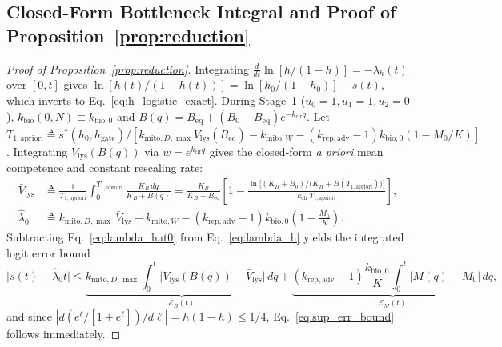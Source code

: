 \documentclass[11pt]{article}
\theoremstyle{plain}
\theoremstyle{remark}
\begin{document}
\subsection{Closed-Form Bottleneck Integral and Proof of Proposition~\ref{prop:reduction}}
\label{app:reduction}
\begin{proof}[Proof of Proposition~\ref{prop:reduction}]
Integrating $\frac{d}{dt}\ln[h/(1-h)] = -\lambda_h(t)$ over $[0, t]$ gives $\ln[h(t)/(1-h(t))] = \ln[h_0/(1-h_0)] - s(t)$, which inverts to Eq.~\eqref{eq:h_logistic_exact}. During Stage~1 ($u_0=1, u_1=1, u_2=0$), $k_{\mathrm{bio}}(0, N) \equiv k_{\mathrm{bio},0}$ and $B(q) = B_{\mathrm{eq}} + (B_0 - B_{\mathrm{eq}})e^{-k_{\mathrm{clr}}q}$. Let $T_{1,\mathrm{apriori}} \triangleq s^*(h_0, h_{\mathrm{gate}}) / [k_{\mathrm{mito},D,\max}V_{\mathrm{lys}}(B_{\mathrm{eq}}) - k_{\mathrm{mito},W} - (k_{\mathrm{rep,adv}}-1)k_{\mathrm{bio},0}(1 - M_0/K)]$. Integrating $V_{\mathrm{lys}}(B(q))$ via $w = e^{k_{\mathrm{clr}}q}$ gives the closed-form \textit{a priori} mean competence and constant rescaling rate:
\begin{align}
  \bar{V}_{\mathrm{lys}} &\triangleq \frac{1}{T_{1,\mathrm{apriori}}}\int_0^{T_{1,\mathrm{apriori}}} \frac{K_B\,dq}{K_B + B(q)} = \frac{K_B}{K_B + B_{\mathrm{eq}}}\!\left[1 - \frac{\ln\!\big[(K_B + B_0)/\big(K_B + B(T_{1,\mathrm{apriori}})\big)\big]}{k_{\mathrm{clr}}\,T_{1,\mathrm{apriori}}}\right], \label{eq:vlys_bar_closed} \\
  \hat{\lambda}_0 &\triangleq k_{\mathrm{mito},D,\max}\,\bar{V}_{\mathrm{lys}} - k_{\mathrm{mito},W} - (k_{\mathrm{rep,adv}} - 1)k_{\mathrm{bio},0}\!\left(1 - \frac{M_0}{K}\right). \label{eq:lambda_hat0}
\end{align}
Subtracting Eq.~\eqref{eq:lambda_hat0} from Eq.~\eqref{eq:lambda_h} yields the integrated logit error bound
\begin{equation}
  \big|s(t) - \hat{\lambda}_0 t\big| \le \underbrace{k_{\mathrm{mito},D,\max}\!\int_0^t \big|V_{\mathrm{lys}}(B(q)) - \bar{V}_{\mathrm{lys}}\big|\,dq}_{\mathcal{E}_B(t)} + \underbrace{(k_{\mathrm{rep,adv}}-1)\frac{k_{\mathrm{bio},0}}{K}\!\int_0^t \big|M(q) - M_0\big|\,dq}_{\mathcal{E}_M(t)},
  \label{eq:multi_term_bound}
\end{equation}
and since $|d(e^\ell/[1+e^\ell])/d\ell| = h(1-h) \le 1/4$, Eq.~\eqref{eq:sup_err_bound} follows immediately.
\end{proof}
\end{document}
